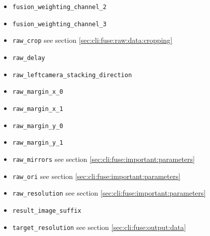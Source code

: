 \begin{itemize}
\item \texttt{fusion\_weighting\_channel\_2}
\item \texttt{fusion\_weighting\_channel\_3}
\item \texttt{raw\_crop} see section \ref{sec:cli:fuse:raw:data:cropping}
\item \texttt{raw\_delay}
\item \texttt{raw\_leftcamera\_stacking\_direction}
\item \texttt{raw\_margin\_x\_0}
\item \texttt{raw\_margin\_x\_1}
\item \texttt{raw\_margin\_y\_0}
\item \texttt{raw\_margin\_y\_1}
\item \texttt{raw\_mirrors} see section \ref{sec:cli:fuse:important:parameters}
\item \texttt{raw\_ori} see section \ref{sec:cli:fuse:important:parameters}
\item \texttt{raw\_resolution} see section \ref{sec:cli:fuse:important:parameters}
\item \texttt{result\_image\_suffix}
\item \texttt{target\_resolution} see section \ref{sec:cli:fuse:output:data}
\end{itemize}

